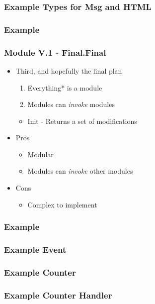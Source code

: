 \begin{frame}
  \frametitle{Example Types for Msg and HTML}
  
\end{frame}

\hidelogo
\begin{frame}
  \frametitle{Example}
  
\end{frame}

\showlogo
\begin{frame}
  \frametitle{Module V.1 - Final.Final}
  \begin{itemize}
    \item Third, and hopefully the final plan
      \pause
      \begin{enumerate}
        \item Everything* is a module
          \pause
        \item Modules can \textit{invoke} modules
          \pause
      \end{enumerate}
      \begin{itemize}
        \item Init - Returns a set of modifications
      \end{itemize}
      \pause
    \item Pros
      \pause
      \begin{itemize}
        \item Modular
          \pause
        \item Modules can \textit{invoke} other modules
      \end{itemize}
      \pause
    \item Cons
      \begin{itemize}
          \pause
        \item Complex to implement
      \end{itemize}
  \end{itemize}
\end{frame}

\begin{frame}
  \frametitle{Example}
  
\end{frame}


\begin{frame}
  \frametitle{Example Event}
  
\end{frame}


\begin{frame}
  \frametitle{Example Counter}
  
\end{frame}


\begin{frame}
  \frametitle{Example Counter Handler}
  
\end{frame}

